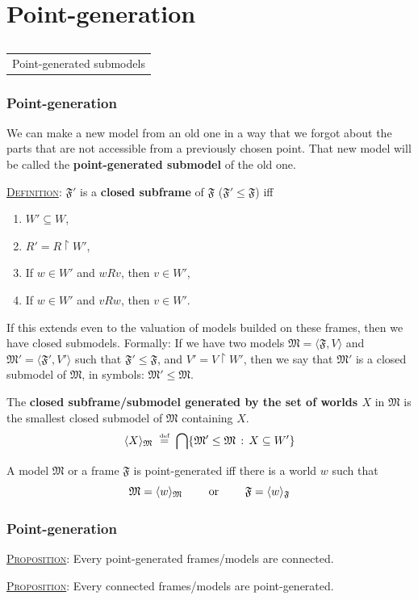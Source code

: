 \documentclass[xcolor=x11names]{beamer}
\makeatletter
\let\beamer@writeslidentry@miniframeson=\beamer@writeslidentry
\def\beamer@writeslidentry@miniframesoff{%
  \expandafter\beamer@ifempty\expandafter{\beamer@framestartpage}{}%
  {%
    \clearpage\beamer@notesactions%
  }
}
\newcommand*{\miniframeson}{\let\beamer@writeslidentry=\beamer@writeslidentry@miniframeson}
\newcommand*{\miniframesoff}{\let\beamer@writeslidentry=\beamer@writeslidentry@miniframesoff}
\newcommand{\cimdia}[1] {\miniframesoff \begin{frame}\begin{center}\huge \begin{tabular}{c}#1\end{tabular}\end{center}\end{frame}\miniframeson}
\newcommand{\szakasz}[2][]{\section{#1}\subsection{}\cimdia{#2}}
\newcommand{\bemph}[1] {{\color{DeepSkyBlue3}{#1}}}
\renewcommand{\emph}[1]{\textbf{#1}}
\newcommand{\dzsa}[1]{\textsc{\underline{#1}}:}
\newcommand{\defegy}[1][.1]{\hspace{#1cm}\overset{\textup{\tiny def}}{=}\hspace{#1cm}}
\makeatother
\begin{document}
\szakasz[Point-generation]{Point-generated submodels}
\begin{frame}[t]
\frametitle{Point-generation}
\footnotesize
We can make a new model from an old one in a way that we forgot about the parts that are not accessible from a previously chosen point. That new model will be called the \emph{point-generated submodel} of the old one.

\dzsa{Definition}
$\mathfrak F'$ is a \emph{closed subframe} of  $\mathfrak F$ ($\mathfrak F'\leq \mathfrak F$) iff
\begin{enumerate}
\item $W'\subseteq W$,
\item $R'= R\upharpoonright W' $,
\item If $w\in W' $ and $wRv $, then $v\in W'$,
\item If $w\in W' $ and $vRw $, then $v\in W'$. \hfill \bemph{(Because we are temporal!)}
\end{enumerate}

If this extends even to the valuation of models builded on these frames, then we have closed submodels. Formally: If we have two models $\mathfrak M = \langle \mathfrak F, V\rangle$ and $\mathfrak M' = \langle \mathfrak F', V'\rangle$ such that $\mathfrak F'\leq \mathfrak F$, and $V'= V\upharpoonright W' $, then we say that $\mathfrak M'$ is a closed submodel of $\mathfrak M$, in symbols: $\mathfrak M'\leq \mathfrak M$.

\bigskip

The \emph{closed subframe/submodel generated by the set of worlds $X$} in $\mathfrak M$ is the smallest closed submodel of $\mathfrak M$ containing $X$.
\[ \langle X \rangle_{\mathfrak M} \defegy \bigcap \{ \mathfrak M'\leq \mathfrak M \, : \, X\subseteq W' \}    \]

A model $\mathfrak M$ or a frame $\mathfrak F$ is point-generated iff there is a world $w$ such that
\[ \mathfrak M = \langle w\rangle_\mathfrak M \qquad \textup{ or }\qquad \mathfrak F = \langle w\rangle_\mathfrak F\]


\end{frame}


\begin{frame}[t]
\frametitle{Point-generation}
\footnotesize

\dzsa{Proposition} Every point-generated frames/models are connected.

\dzsa{Proposition} Every connected frames/models are point-generated.



\end{frame}
\end{document}
